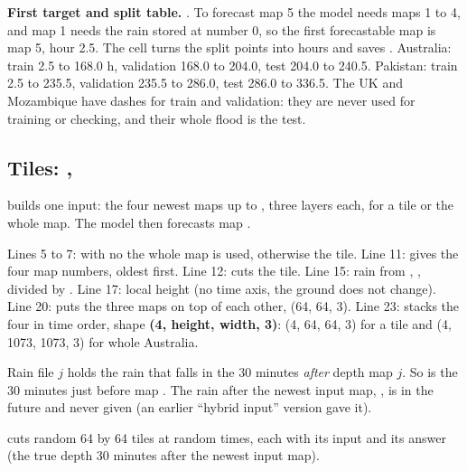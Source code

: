 \textbf{First target and split table.} . To forecast map 5 the model needs maps 1 to 4, and map 1 needs the rain stored at number 0, so the first forecastable map is map 5, hour 2.5. The cell turns the split points into hours and saves . Australia: train 2.5 to 168.0 h, validation 168.0 to 204.0, test 204.0 to 240.5. Pakistan: train 2.5 to 235.5, validation 235.5 to 286.0, test 286.0 to 336.5. The UK and Mozambique have dashes for train and validation: they are never used for training or checking, and their whole flood is the test.

\subsection{Tiles: , }

\textbf{} builds one input: the four newest maps up to , three layers each, for a tile or the whole map. The model then forecasts map .


Lines 5 to 7: with no  the whole map is used, otherwise the tile. Line 11:  gives the four map numbers, oldest first. Line 12:  cuts the tile. Line 15: rain from , , divided by . Line 17: local height (no time axis, the ground does not change). Line 20:  puts the three maps on top of each other, (64, 64, 3). Line 23:  stacks the four in time order, shape \textbf{(4, height, width, 3)}: (4, 64, 64, 3) for a tile and (4, 1073, 1073, 3) for whole Australia.

\begin{carefulbox}
Rain file $j$ holds the rain that falls in the 30 minutes \emph{after} depth map $j$. So  is the 30 minutes just before map . The rain after the newest input map, , is in the future and never given (an earlier ``hybrid input'' version gave it).
\end{carefulbox}

\textbf{} cuts  random 64 by 64 tiles at random times, each with its input and its answer (the true depth 30 minutes after the newest input map).

